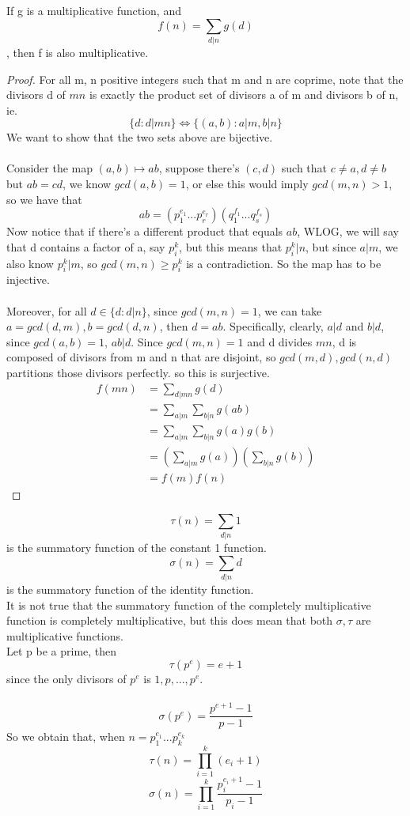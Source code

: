 \begin{lemma}
If g is a multiplicative function, and
\[f(n) = \sum_{d | n} g(d)\]
, then f is also multiplicative.
\end{lemma}

\begin{proof}
For all m, n positive integers such that m and n are coprime, note that the divisors d of $mn$ is exactly the product set of divisors a of m and divisors b of n, ie.
\[\{d : d | mn\} \iff \{(a, b) : a | m, b | n\}\]
We want to show that the two sets above are bijective.\\\\
Consider the map $(a, b) \mapsto ab$, suppose there's $(c, d)$ such that $c \neq a, d \neq b$ but $ab = cd$, we know $gcd(a, b) = 1$, or else this would imply $gcd(m, n) > 1$, so we have that
\[ab = (p_1^{e_1}...p_r^{e_r})(q_1^{f_1}...q_s^{f_s})\]
Now notice that if there's a different product that equals $ab$, WLOG, we will say that d contains a factor of a, say $p_i^k$, but this means that $p_i^k | n$, but since $a | m$, we also know $p_i^k | m$, so $gcd(m, n) \geq p_i^k$ is a contradiction. So the map has to be injective.\\\\
Moreover, for all $d \in \{d : d|n\}$, since $gcd(m, n) = 1$, we can take $a = gcd(d, m), b = gcd(d, n)$, then $d = ab$. Specifically, clearly, $a | d$ and $b | d$, since $gcd(a, b) = 1$, $ab | d$. Since $gcd(m, n) = 1$ and d divides $mn$, d is composed of divisors from m and n that are disjoint, so $gcd(m, d), gcd(n, d)$ partitions those divisors perfectly.
so this is surjective.
\begin{align*}
    f(mn) &= \sum_{d | mn} g(d)\\
    &= \sum_{a | m}\sum_{b | n} g(ab) \tag*{Bijection of Sets Above}\\
    &= \sum_{a | m}\sum_{b | n} g(a)g(b) \tag*{$(a, b) = 1$}\\
    &= (\sum_{a | m}g(a))(\sum_{b | n} g(b)) \\
    &= f(m)f(n)
\end{align*}
\end{proof}

\begin{remark}
\[\tau(n) = \sum_{d | n} 1\]
is the summatory function of the constant 1 function.
\[\sigma(n) = \sum_{d | n} d\]
is the summatory function of the identity function.\\
It is not true that the summatory function of the completely multiplicative function is completely multiplicative, but this does mean that both $\sigma, \tau$ are multiplicative functions.\\
Let p be a prime, then
\[\tau(p^e) = e + 1\]
since the only divisors of $p^e$ is $1, p, ..., p^e$.\\\\
\[\sigma(p^e) = \frac{p^{e+1} - 1}{p - 1}\]
So we obtain that, when $n = p_1^{e_1}...p_k^{e_k}$
\[\tau(n) = \prod_{i = 1}^k (e_i + 1)\]
\[\sigma(n) = \prod_{i = 1}^k \frac{p_i^{e_i+1} - 1}{p_i - 1}\]
\end{remark}

